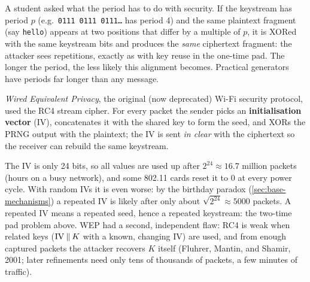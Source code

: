 \begin{remark}
A student asked what the period has to do with security. If the keystream has period $p$ (e.g.\ \texttt{0111 0111 0111\dots} has period 4) and the same plaintext fragment (say \texttt{hello}) appears at two positions that differ by a multiple of $p$, it is XORed with the same keystream bits and produces the \emph{same} ciphertext fragment: the attacker sees repetitions, exactly as with key reuse in the one-time pad. The longer the period, the less likely this alignment becomes. Practical generators have periods far longer than any message.
\end{remark}

\begin{example}[WEP]
\emph{Wired Equivalent Privacy}, the original (now deprecated) Wi-Fi security protocol, used the RC4 stream cipher. For every packet the sender picks an \textbf{initialisation vector} (IV), concatenates it with the shared key to form the seed, and XORs the PRNG output with the plaintext; the IV is sent \emph{in clear} with the ciphertext so the receiver can rebuild the same keystream.

\begin{center}
\end{center}

The IV is only 24 bits, so all values are used up after $2^{24} \approx 16.7$ million packets (hours on a busy network), and some 802.11 cards reset it to 0 at every power cycle. With random IVs it is even worse: by the birthday paradox (\cref{sec:base-mechanisms}) a repeated IV is likely after only about $\sqrt{2^{24}} \approx 5000$ packets. A repeated IV means a repeated seed, hence a repeated keystream: the two-time pad problem above. WEP had a second, independent flaw: RC4 is weak when related keys ($\mathrm{IV} \mathbin{\|} K$ with a known, changing IV) are used, and from enough captured packets the attacker recovers $K$ itself (Fluhrer, Mantin, and Shamir, 2001; later refinements need only tens of thousands of packets, a few minutes of traffic).
\end{example}

